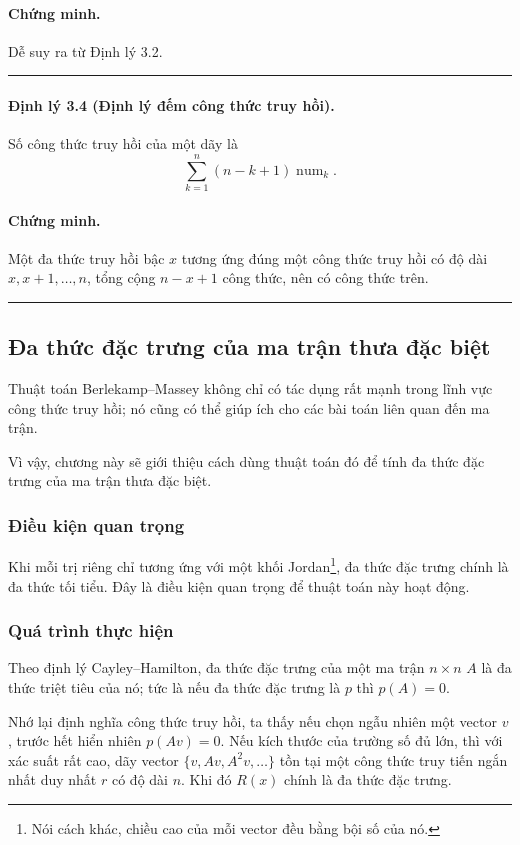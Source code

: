 \documentclass[11pt]{article}
\newcommand{\num}{\operatorname{num}}
\newcommand{\qedmark}{\hfill\rule{0.7ex}{0.7ex}}
\begin{document}
\paragraph{Chứng minh.}
Dễ suy ra từ Định lý 3.2. \qedmark

\paragraph{Định lý 3.4 (Định lý đếm công thức truy hồi).}
Số công thức truy hồi của một dãy là
\[
  \sum_{k=1}^{n}(n-k+1)\num_k.
\]

\paragraph{Chứng minh.}
Một đa thức truy hồi bậc \(x\) tương ứng đúng một công thức truy hồi có độ dài
\(x,x+1,\ldots,n\), tổng cộng \(n-x+1\) công thức, nên có công thức trên.
\qedmark

\subsection{Đa thức đặc trưng của ma trận thưa đặc biệt}

Thuật toán Berlekamp--Massey không chỉ có tác dụng rất mạnh trong lĩnh vực
công thức truy hồi; nó cũng có thể giúp ích cho các bài toán liên quan đến ma
trận.

Vì vậy, chương này sẽ giới thiệu cách dùng thuật toán đó để tính đa thức đặc
trưng của ma trận thưa đặc biệt.

\subsubsection{Điều kiện quan trọng}

Khi mỗi trị riêng chỉ tương ứng với một khối Jordan\footnote{Nói cách khác,
chiều cao của mỗi vector đều bằng bội số của nó.}, đa thức đặc trưng chính là
đa thức tối tiểu. Đây là điều kiện quan trọng để thuật toán này hoạt động.

\subsubsection{Quá trình thực hiện}

Theo định lý Cayley--Hamilton, đa thức đặc trưng của một ma trận \(n\times n\)
\(A\) là đa thức triệt tiêu của nó; tức là nếu đa thức đặc trưng là \(p\) thì
\(p(A)=0\).

Nhớ lại định nghĩa công thức truy hồi, ta thấy nếu chọn ngẫu nhiên một vector
\(v\), trước hết hiển nhiên \(p(Av)=0\). Nếu kích thước của trường số đủ lớn,
thì với xác suất rất cao, dãy vector \(\{v,Av,A^2v,\ldots\}\) tồn tại một công
thức truy tiến ngắn nhất duy nhất \(r\) có độ dài \(n\). Khi đó \(R(x)\) chính
là đa thức đặc trưng.
\end{document}
